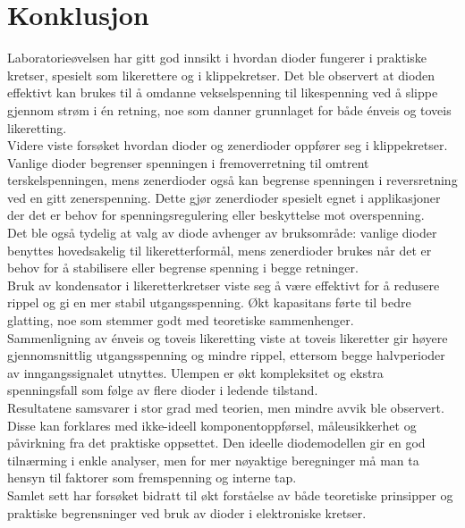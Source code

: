 \section{Konklusjon}
Laboratorieøvelsen har gitt god innsikt i hvordan dioder fungerer i praktiske kretser, spesielt som likerettere og i klippekretser. Det ble observert at dioden effektivt kan brukes til å omdanne vekselspenning til likespenning ved å slippe gjennom strøm i én retning, noe som danner grunnlaget for både énveis og toveis likeretting.
\\[1em]
Videre viste forsøket hvordan dioder og zenerdioder oppfører seg i klippekretser. Vanlige dioder begrenser spenningen i fremoverretning til omtrent terskelspenningen, mens zenerdioder også kan begrense spenningen i reversretning ved en gitt zenerspenning. Dette gjør zenerdioder spesielt egnet i applikasjoner der det er behov for spenningsregulering eller beskyttelse mot overspenning.
\\[1em]
Det ble også tydelig at valg av diode avhenger av bruksområde: vanlige dioder benyttes hovedsakelig til likeretterformål, mens zenerdioder brukes når det er behov for å stabilisere eller begrense spenning i begge retninger.
\\[1em]
Bruk av kondensator i likeretterkretser viste seg å være effektivt for å redusere rippel og gi en mer stabil utgangsspenning. Økt kapasitans førte til bedre glatting, noe som stemmer godt med teoretiske sammenhenger.
\\[1em]
Sammenligning av énveis og toveis likeretting viste at toveis likeretter gir høyere gjennomsnittlig utgangsspenning og mindre rippel, ettersom begge halvperioder av inngangssignalet utnyttes. Ulempen er økt kompleksitet og ekstra spenningsfall som følge av flere dioder i ledende tilstand.
\\[1em]
Resultatene samsvarer i stor grad med teorien, men mindre avvik ble observert. Disse kan forklares med ikke-ideell komponentoppførsel, måleusikkerhet og påvirkning fra det praktiske oppsettet. Den ideelle diodemodellen gir en god tilnærming i enkle analyser, men for mer nøyaktige beregninger må man ta hensyn til faktorer som fremspenning og interne tap.
\\[1em]
Samlet sett har forsøket bidratt til økt forståelse av både teoretiske prinsipper og praktiske begrensninger ved bruk av dioder i elektroniske kretser.